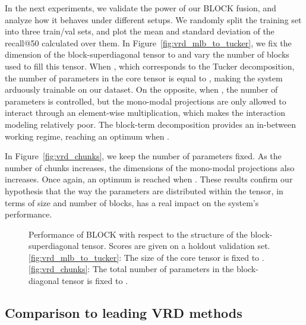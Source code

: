 \documentclass[letterpaper]{article} \usepackage{aaai19}  \usepackage{times}  \usepackage{helvet}  \usepackage{courier}  \usepackage{url}  \usepackage{graphicx}  \usepackage{booktabs}       \usepackage{comment}
\begin{document}
In the next experiments, we validate the power of our BLOCK fusion, and analyze how it behaves under different setups. We randomly split the training set into three train/val sets, and plot the mean and standard deviation of the recall@50 calculated over them. In Figure~\ref{fig:vrd_mlb_to_tucker}, we fix the dimension of the block-superdiagonal tensor to  and vary the number of blocks used to fill this tensor. 
When , which corresponds to the Tucker decomposition, the number of parameters in the core tensor is equal to , making the system arduously trainable on our dataset. On the opposite, when , the number of parameters is controlled, but the mono-modal projections are only allowed to interact through an element-wise multiplication, which makes the interaction modeling relatively poor.
The block-term decomposition provides an in-between working regime, reaching an optimum when .

In Figure~\ref{fig:vrd_chunks}, we keep the number of parameters fixed. As the number of chunks increases, the dimensions of the mono-modal projections also increases. Once again, an optimum is reached when . These results confirm our hypothesis that the way the parameters are distributed within the tensor, in terms of size and number of blocks, has a real impact on the system's performance.

\begin{figure}[t]
\centering
  \caption{Performance of BLOCK with respect to the structure of the block-superdiagonal tensor. Scores are given on a holdout validation set. \ref{fig:vrd_mlb_to_tucker}: The size of the core tensor is fixed to . \ref{fig:vrd_chunks}: The total number of parameters in the block-diagonal tensor is fixed to .}
\end{figure}


\subsection{Comparison to leading VRD methods}
\end{document}
